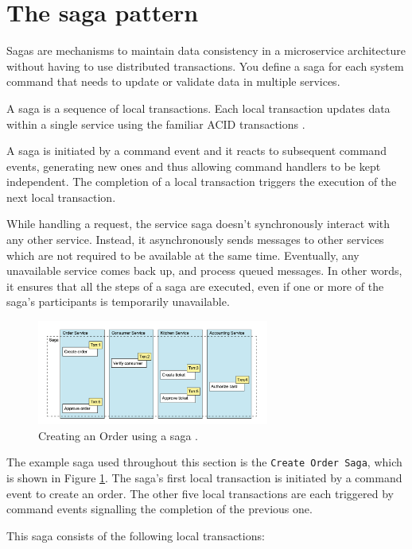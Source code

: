 \documentclass[conference]{IEEEtran}
\begin{document}
\section{The saga pattern}

Sagas are mechanisms to maintain data consistency in a microservice architecture without having to use distributed transactions. You define a saga for each system command that needs to update or validate data in multiple services.

A saga is a sequence of local transactions. Each local transaction updates data within a single service using the familiar ACID transactions \cite{microservices-patterns-saga}.

A saga is initiated by a command event and it reacts to subsequent command events, generating new ones and thus allowing command handlers to be kept independent. The completion of a local transaction triggers the execution of the next local transaction.

While handling a request, the service saga doesn't synchronously interact with any other service. Instead, it asynchronously sends messages to other services which are not required to be available at the same time. Eventually, any unavailable service comes back up, and process queued messages. In other words, it ensures that all the steps of a saga are executed, even if one or more of the saga's participants is temporarily unavailable.

\begin{figure}[!htbp]
\centering
\includegraphics[width=3in]{jpeg/order-saga}
\caption{Creating an Order using a saga \cite{microservices-patterns-saga}.}
\label{order_saga}
\end{figure}

The example saga used throughout this section is the \texttt{Create Order Saga}, which is shown in Figure \ref{order_saga}. The saga's first local transaction is initiated by a command event to create an order. The other five local transactions are each triggered by command events signalling the completion of the previous one.

This saga consists of the following local transactions:
\end{document}
